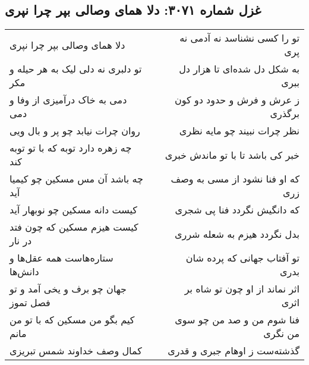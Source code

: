 \begin{center}
\section*{غزل شماره ۳۰۷۱: دلا همای وصالی بپر چرا نپری}
\label{sec:3071}
\begin{longtable}{l p{0.5cm} r}
دلا همای وصالی بپر چرا نپری
&&
تو را کسی نشناسد نه آدمی نه پری
\\
تو دلبری نه دلی لیک به هر حیله و مکر
&&
به شکل دل شده‌ای تا هزار دل ببری
\\
دمی به خاک درآمیزی از وفا و دمی
&&
ز عرش و فرش و حدود دو کون برگذری
\\
روان چرات نیابد چو پر و بال ویی
&&
نظر چرات نبیند چو مایه نظری
\\
چه زهره دارد توبه که با تو توبه کند
&&
خبر کی باشد تا با تو ماندش خبری
\\
چه باشد آن مس مسکین چو کیمیا آید
&&
که او فنا نشود از مسی به وصف زری
\\
کیست دانه مسکین چو نوبهار آید
&&
که دانگیش نگردد فنا پی شجری
\\
کیست هیزم مسکین که چون فتد در نار
&&
بدل نگردد هیزم به شعله شرری
\\
ستاره‌هاست همه عقل‌ها و دانش‌ها
&&
تو آفتاب جهانی که پرده شان بدری
\\
جهان چو برف و یخی آمد و تو فصل تموز
&&
اثر نماند از او چون تو شاه بر اثری
\\
کیم بگو من مسکین که با تو من مانم
&&
فنا شوم من و صد من چو سوی من نگری
\\
کمال وصف خداوند شمس تبریزی
&&
گذشته‌ست ز اوهام جبری و قدری
\\
\end{longtable}
\end{center}
